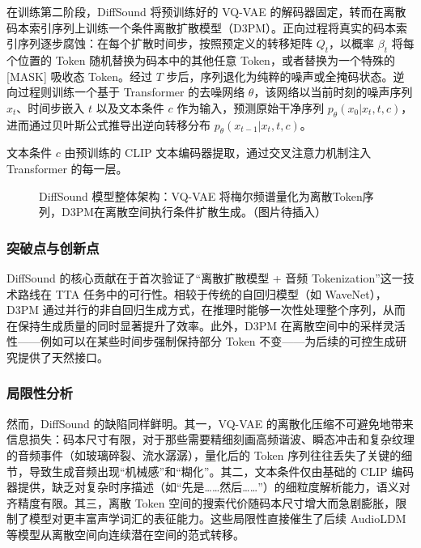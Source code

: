 \documentclass[12pt,a4paper]{article}
\begin{document}
在训练第二阶段，DiffSound 将预训练好的 VQ-VAE 的解码器固定，转而在离散码本索引序列上训练一个条件离散扩散模型（D3PM）。正向过程将真实的码本索引序列逐步腐蚀：在每个扩散时间步，按照预定义的转移矩阵 \(Q_t\)，以概率 \(\beta_t\) 将每个位置的 Token 随机替换为码本中的其他任意 Token，或者替换为一个特殊的 [MASK] 吸收态 Token。经过 \(T\) 步后，序列退化为纯粹的噪声或全掩码状态。逆向过程则训练一个基于 Transformer 的去噪网络 \(\theta\)，该网络以当前时刻的噪声序列 \(x_t\)、时间步嵌入 \(t\) 以及文本条件 \(c\) 作为输入，预测原始干净序列 \(p_\theta(x_0 | x_t, t, c)\)，进而通过贝叶斯公式推导出逆向转移分布 \(p_\theta(x_{t-1} | x_t, t, c)\)。

文本条件 \(c\) 由预训练的 CLIP 文本编码器提取，通过交叉注意力机制注入 Transformer 的每一层。

\begin{figure}[htbp]
\centering
{}
\caption{DiffSound 模型整体架构：VQ-VAE 将梅尔频谱量化为离散Token序列，D3PM在离散空间执行条件扩散生成。（图片待插入）}
\label{fig:diffsound}
\end{figure}

\subsubsection{突破点与创新点}
DiffSound 的核心贡献在于首次验证了“离散扩散模型 + 音频 Tokenization”这一技术路线在 TTA 任务中的可行性。相较于传统的自回归模型（如 WaveNet），D3PM 通过并行的非自回归生成方式，在推理时能够一次性处理整个序列，从而在保持生成质量的同时显著提升了效率。此外，D3PM 在离散空间中的采样灵活性——例如可以在某些时间步强制保持部分 Token 不变——为后续的可控生成研究提供了天然接口。

\subsubsection{局限性分析}
然而，DiffSound 的缺陷同样鲜明。其一，VQ-VAE 的离散化压缩不可避免地带来信息损失：码本尺寸有限，对于那些需要精细刻画高频谐波、瞬态冲击和复杂纹理的音频事件（如玻璃碎裂、流水潺潺），量化后的 Token 序列往往丢失了关键的细节，导致生成音频出现“机械感”和“糊化”。其二，文本条件仅由基础的 CLIP 编码器提供，缺乏对复杂时序描述（如“先是……然后……”）的细粒度解析能力，语义对齐精度有限。其三，离散 Token 空间的搜索代价随码本尺寸增大而急剧膨胀，限制了模型对更丰富声学词汇的表征能力。这些局限性直接催生了后续 AudioLDM 等模型从离散空间向连续潜在空间的范式转移。
\end{document}
